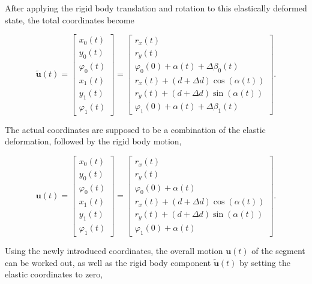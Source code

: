 After applying the rigid body translation and rotation to this elastically deformed state, the total coordinates become

\begin{equation}
\renewcommand\arraystretch{1.5}
\tilde{\boldsymbol{u}}(t)
=
\begin{bmatrix}
x_0(t) \\
y_0(t) \\
\varphi_0(t) \\
x_1(t) \\
y_1(t) \\
\varphi_1(t)
\end{bmatrix}
=
\begin{bmatrix}
r_x(t) \\
r_y(t) \\
\varphi_0(0) + \alpha(t) + \Delta\beta_0(t) \\
r_x(t) + (d + \Delta d)\cos(\alpha(t)) \\
r_y(t) + (d + \Delta d)\sin(\alpha(t)) \\
\varphi_1(0) + \alpha(t) + \Delta\beta_1(t)
\end{bmatrix}
.
\end{equation}

The actual coordinates are supposed to be a combination of the elastic deformation, followed by the rigid body motion,

\begin{equation}
\renewcommand\arraystretch{1.5}
\boldsymbol{u}(t) = \begin{bmatrix}
x_0(t) \\
y_0(t) \\
\varphi_0(t) \\
x_1(t) \\
y_1(t) \\
\varphi_1(t)
\end{bmatrix}
 = \begin{bmatrix}
r_x(t) \\
r_y(t) \\
\varphi_0(0) + \alpha(t) \\
r_x(t) + (d + \Delta d)\cos(\alpha(t)) \\
r_y(t) + (d + \Delta d)\sin(\alpha(t)) \\
\varphi_1(0) + \alpha(t)
\end{bmatrix}.
\end{equation}




\newpage

Using the newly introduced coordinates, the overall motion $\boldsymbol{u}(t)$ of the segment can be worked out, as well as the rigid body component $\tilde{\boldsymbol{u}}(t)$ by setting the elastic coordinates to zero,

